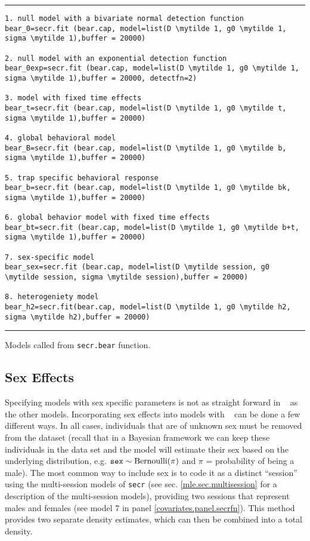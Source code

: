 \begin{panel}[htp]
\centering
\rule[0.1in]{\textwidth}{.03in}
{\small
\begin{Verbatim}[commandchars=\\\{\}]
1. null model with a bivariate normal detection function
bear_0=secr.fit (bear.cap, model=list(D \mytilde 1, g0 \mytilde 1, sigma \mytilde 1),buffer = 20000)

2. null model with an exponential detection function
bear_0exp=secr.fit (bear.cap, model=list(D \mytilde 1, g0 \mytilde 1, sigma \mytilde 1),buffer = 20000, detectfn=2)

3. model with fixed time effects
bear_t=secr.fit (bear.cap, model=list(D \mytilde 1, g0 \mytilde t, sigma \mytilde 1),buffer = 20000)

4. global behavioral model
bear_B=secr.fit (bear.cap, model=list(D \mytilde 1, g0 \mytilde b, sigma \mytilde 1),buffer = 20000)

5. trap specific behavioral response
bear_b=secr.fit (bear.cap, model=list(D \mytilde 1, g0 \mytilde bk, sigma \mytilde 1),buffer = 20000)

6. global behavior model with fixed time effects
bear_bt=secr.fit (bear.cap, model=list(D \mytilde 1, g0 \mytilde b+t, sigma \mytilde 1),buffer = 20000)

7. sex-specific model
bear_sex=secr.fit (bear.cap, model=list(D \mytilde session, g0 \mytilde session, sigma \mytilde session),buffer = 20000)

8. heterogeniety model
bear_h2=secr.fit(bear.cap, model=list(D \mytilde 1, g0 \mytilde h2, sigma \mytilde h2),buffer = 20000)
\end{Verbatim}
}

\rule[-0.1in]{\textwidth}{.03in}
\caption{
Models called from \mbox{\tt secr.bear} function. }
\label{covariates.panel.secrfn}
\end{panel}


\subsection{Sex Effects}
\label{covariates.secr.sex}

Specifying models with sex specific parameters is not as straight
forward in \secr~ as the other models.  Incorporating sex effects into
models with \secr~ can be done a few different ways.  In all cases,
individuals that are of unknown sex must be removed from the dataset
(recall that in a Bayesian framework we can keep these individuals in
the data set and the model will estimate their sex based on the
underlying distribution, e.g. $\mbox{\tt sex} \sim \mbox{Bernoulli}(\pi)$ and $\pi$ =
probability of being a male).  The most common way to include sex is
to code it as a distinct ``session'' using the multi-session models of
\mbox{\tt secr} (see sec. \ref{mle.sec.multisession} for a description
of the multi-session models), providing two sessions that represent
males and females (see model 7 in panel
\ref{covariates.panel.secrfn}).  This method provides two separate
density estimates, which can then be combined into a total density.

